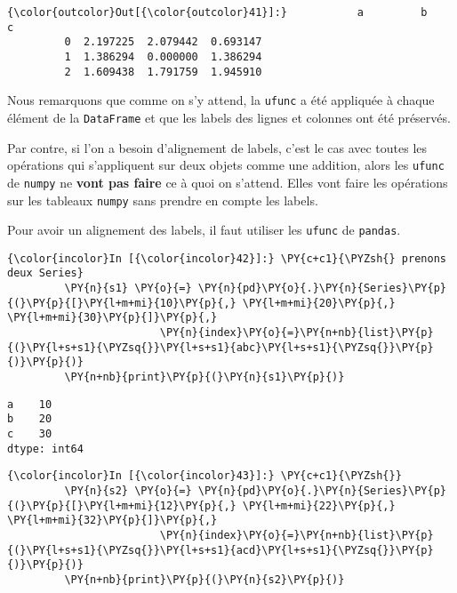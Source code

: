 \begin{Verbatim}[commandchars=\\\{\},frame=single,framerule=0.3mm,rulecolor=\color{cellframecolor}]
{\color{outcolor}Out[{\color{outcolor}41}]:}           a         b         c
         0  2.197225  2.079442  0.693147
         1  1.386294  0.000000  1.386294
         2  1.609438  1.791759  1.945910
\end{Verbatim}
            
    Nous remarquons que comme on s'y attend, la \texttt{ufunc} a été
appliquée à chaque élément de la \texttt{DataFrame} et que les labels
des lignes et colonnes ont été préservés.

    Par contre, si l'on a besoin d'alignement de labels, c'est le cas avec
toutes les opérations qui s'appliquent sur deux objets comme une
addition, alors les \texttt{ufunc} de \texttt{numpy} ne \textbf{vont pas
faire} ce à quoi on s'attend. Elles vont faire les opérations sur les
tableaux \texttt{numpy} sans prendre en compte les labels.

Pour avoir un alignement des labels, il faut utiliser les \texttt{ufunc}
de \texttt{pandas}.

    \begin{Verbatim}[commandchars=\\\{\},frame=single,framerule=0.3mm,rulecolor=\color{cellframecolor}]
{\color{incolor}In [{\color{incolor}42}]:} \PY{c+c1}{\PYZsh{} prenons deux Series}
         \PY{n}{s1} \PY{o}{=} \PY{n}{pd}\PY{o}{.}\PY{n}{Series}\PY{p}{(}\PY{p}{[}\PY{l+m+mi}{10}\PY{p}{,} \PY{l+m+mi}{20}\PY{p}{,} \PY{l+m+mi}{30}\PY{p}{]}\PY{p}{,}
                        \PY{n}{index}\PY{o}{=}\PY{n+nb}{list}\PY{p}{(}\PY{l+s+s1}{\PYZsq{}}\PY{l+s+s1}{abc}\PY{l+s+s1}{\PYZsq{}}\PY{p}{)}\PY{p}{)}
         \PY{n+nb}{print}\PY{p}{(}\PY{n}{s1}\PY{p}{)}
\end{Verbatim}


    \begin{Verbatim}[commandchars=\\\{\},frame=single,framerule=0.3mm,rulecolor=\color{cellframecolor}]
a    10
b    20
c    30
dtype: int64
\end{Verbatim}

    \begin{Verbatim}[commandchars=\\\{\},frame=single,framerule=0.3mm,rulecolor=\color{cellframecolor}]
{\color{incolor}In [{\color{incolor}43}]:} \PY{c+c1}{\PYZsh{}}
         \PY{n}{s2} \PY{o}{=} \PY{n}{pd}\PY{o}{.}\PY{n}{Series}\PY{p}{(}\PY{p}{[}\PY{l+m+mi}{12}\PY{p}{,} \PY{l+m+mi}{22}\PY{p}{,} \PY{l+m+mi}{32}\PY{p}{]}\PY{p}{,}
                        \PY{n}{index}\PY{o}{=}\PY{n+nb}{list}\PY{p}{(}\PY{l+s+s1}{\PYZsq{}}\PY{l+s+s1}{acd}\PY{l+s+s1}{\PYZsq{}}\PY{p}{)}\PY{p}{)}
         \PY{n+nb}{print}\PY{p}{(}\PY{n}{s2}\PY{p}{)}
\end{Verbatim}


